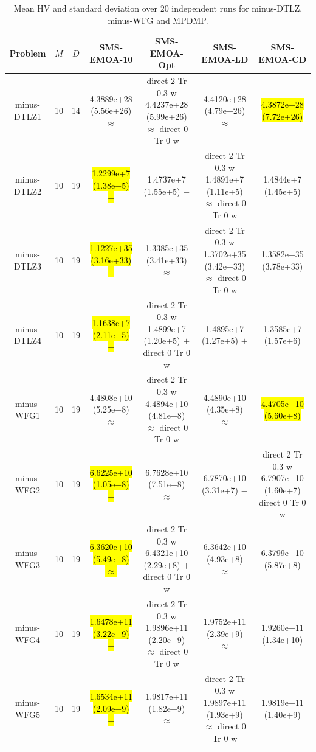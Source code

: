 \documentclass[conference]{IEEEtran}
\newcommand{\semitextbf}[1]{%
	\pdfliteral direct {2 Tr 0.3 w} %
	#1%
	\pdfliteral direct {0 Tr 0 w}%
}
\begin{document}
\begin{table}[!t]\footnotesize
  \renewcommand{\arraystretch}{1.3}
  \caption{Mean HV and standard deviation over 20 independent runs for minus-DTLZ, minus-WFG and MPDMP.} %
  \label{table_itri}
  \centering
  \begin{tabular}{ccccccc}
    \toprule
    Problem&$M$&$D$&SMS-EMOA-10&SMS-EMOA-Opt&SMS-EMOA-LD&SMS-EMOA-CD\\ 
    \midrule
    \multirow{1}{*}{minus-DTLZ1}&10&14&4.3889e+28 (5.56e+26) $\approx$&\semitextbf{4.4237e+28 (5.99e+26) $\approx$}&4.4120e+28 (4.79e+26) $\approx$&\hl{4.3872e+28 (7.72e+26)}\\
    \multirow{1}{*}{minus-DTLZ2}&10&19&\hl{1.2299e+7 (1.38e+5) $-$}&1.4737e+7 (1.55e+5) $-$&\semitextbf{1.4891e+7 (1.11e+5) $\approx$}&1.4844e+7 (1.45e+5)\\
    \multirow{1}{*}{minus-DTLZ3}&10&19&\hl{1.1227e+35 (3.16e+33) $-$}&1.3385e+35 (3.41e+33) $\approx$&\semitextbf{1.3702e+35 (3.42e+33) $\approx$}&1.3582e+35 (3.78e+33)\\
    \multirow{1}{*}{minus-DTLZ4}&10&19&\hl{1.1638e+7 (2.11e+5) $-$}&\semitextbf{1.4899e+7 (1.20e+5) $+$}&1.4895e+7 (1.27e+5) $+$&1.3585e+7 (1.57e+6)\\
    \midrule
    \multirow{1}{*}{minus-WFG1}&10&19&4.4808e+10 (5.25e+8) $\approx$&\semitextbf{4.4894e+10 (4.81e+8) $\approx$}&4.4890e+10 (4.35e+8) $\approx$&\hl{4.4705e+10 (5.60e+8)}\\
    \multirow{1}{*}{minus-WFG2}&10&19&\hl{6.6225e+10 (1.05e+8) $-$}&6.7628e+10 (7.51e+8) $\approx$&6.7870e+10 (3.31e+7) $-$&\semitextbf{6.7907e+10 (1.60e+7)}\\
    \multirow{1}{*}{minus-WFG3}&10&19&\hl{6.3620e+10 (5.49e+8) $\approx$}&\semitextbf{6.4321e+10 (2.29e+8) $+$}&6.3642e+10 (4.93e+8) $\approx$&6.3799e+10 (5.87e+8)\\
    \multirow{1}{*}{minus-WFG4}&10&19&\hl{1.6478e+11 (3.22e+9) $-$}&\semitextbf{1.9896e+11 (2.20e+9) $\approx$}&1.9752e+11 (2.39e+9) $\approx$&1.9260e+11 (1.34e+10)\\
    \multirow{1}{*}{minus-WFG5}&10&19&\hl{1.6534e+11 (2.09e+9) $-$}&1.9817e+11 (1.82e+9) $\approx$&\semitextbf{1.9897e+11 (1.93e+9) $\approx$}&1.9819e+11 (1.40e+9)\\

\end{tabular}
\end{table}
\end{document}
